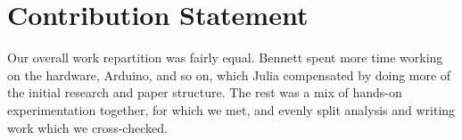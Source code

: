 \section*{Contribution Statement}
Our overall work repartition was fairly equal.
Bennett spent more time working on the hardware, Arduino, and so on, which Julia compensated by doing more of the initial research and paper structure.
The rest was a mix of hands-on experimentation together, for which we met, and evenly split analysis and writing work which we cross-checked.

